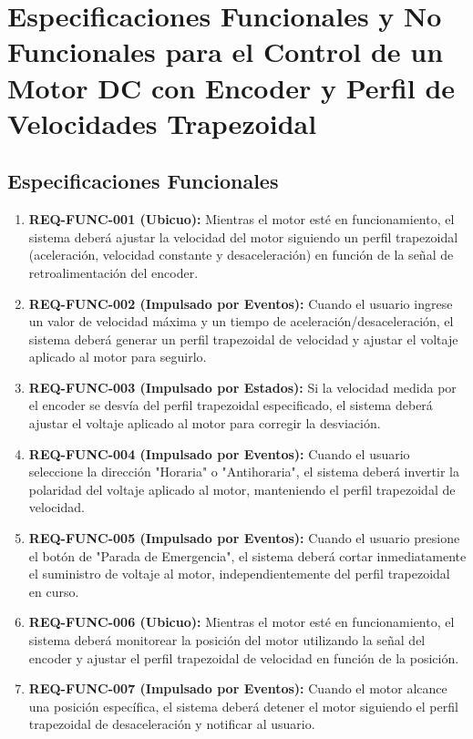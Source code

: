\documentclass{article}
\begin{document}
\section*{Especificaciones Funcionales y No Funcionales para el Control de un Motor DC con Encoder y Perfil de Velocidades Trapezoidal}

\subsection*{Especificaciones Funcionales}
\begin{enumerate}
    \item \textbf{REQ-FUNC-001 (Ubicuo):} 
    Mientras el motor esté en funcionamiento, el sistema deberá ajustar la velocidad del motor siguiendo un perfil trapezoidal (aceleración, velocidad constante y desaceleración) en función de la señal de retroalimentación del encoder.

    \item \textbf{REQ-FUNC-002 (Impulsado por Eventos):} 
    Cuando el usuario ingrese un valor de velocidad máxima y un tiempo de aceleración/desaceleración, el sistema deberá generar un perfil trapezoidal de velocidad y ajustar el voltaje aplicado al motor para seguirlo.

    \item \textbf{REQ-FUNC-003 (Impulsado por Estados):} 
    Si la velocidad medida por el encoder se desvía del perfil trapezoidal especificado, el sistema deberá ajustar el voltaje aplicado al motor para corregir la desviación.

    \item \textbf{REQ-FUNC-004 (Impulsado por Eventos):} 
    Cuando el usuario seleccione la dirección "Horaria" o "Antihoraria", el sistema deberá invertir la polaridad del voltaje aplicado al motor, manteniendo el perfil trapezoidal de velocidad.

    \item \textbf{REQ-FUNC-005 (Impulsado por Eventos):} 
    Cuando el usuario presione el botón de "Parada de Emergencia", el sistema deberá cortar inmediatamente el suministro de voltaje al motor, independientemente del perfil trapezoidal en curso.

    \item \textbf{REQ-FUNC-006 (Ubicuo):} 
    Mientras el motor esté en funcionamiento, el sistema deberá monitorear la posición del motor utilizando la señal del encoder y ajustar el perfil trapezoidal de velocidad en función de la posición.

    \item \textbf{REQ-FUNC-007 (Impulsado por Eventos):} 
    Cuando el motor alcance una posición específica, el sistema deberá detener el motor siguiendo el perfil trapezoidal de desaceleración y notificar al usuario.
\end{enumerate}
\end{document}
